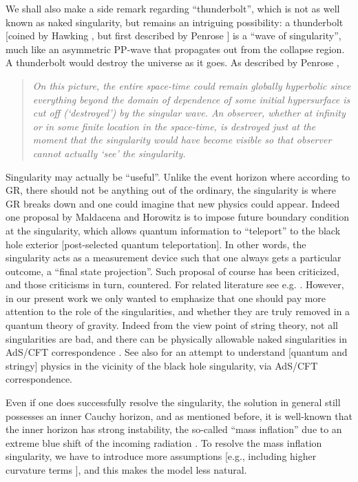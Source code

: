 \documentclass[12pt]{article}
\newcommand{\2}{$^2$}
\newcommand{\3}{$^3$}
\newcommand{\4}{$_4$}
\newcommand{\5}{$_5$}
\begin{document}
We shall also make a side remark regarding ``thunderbolt'', which is not as well known as naked singularity, but remains an intriguing possibility: a thunderbolt [coined by Hawking \cite{Hawking1993}, but first described by Penrose \cite{Penrose1978}] is a ``wave of singularity'', much like an asymmetric PP-wave that propagates out from the collapse region. A thunderbolt would destroy the universe as it goes. As described by Penrose \cite{Penrose1999}, 
\begin{quote}
\emph{On this picture, the entire space-time could remain globally hyperbolic since everything beyond the domain of dependence of some initial hypersurface is cut off (‘destroyed’) by the singular wave. An observer, whether at infinity or in some finite location in the space-time, is destroyed just at the moment that the singularity would have become visible so that observer cannot actually ‘see’ the singularity.}
\end{quote}

Singularity may actually be ``useful''. Unlike the event horizon where according to GR, there should not be anything out of the ordinary, the singularity is where GR breaks down and one could imagine that new physics could appear. Indeed one proposal by Maldacena and Horowitz is to impose future boundary condition at the singularity, which allows quantum information to ``teleport'' to the black hole exterior \cite{MalHor} [post-selected quantum teleportation]. In other words, the singularity acts as a measurement device such that one always gets a particular outcome, a ``final state projection''. Such proposal of course has been criticized, and those criticisms in turn, countered. For related literature see e.g. \cite{MH1,MH2,MH3,MH4,MH5}. However, in our present work we only wanted to emphasize that one should pay more attention to the role of the singularities, and whether they are truly removed in a quantum theory of gravity. Indeed from the view point of string theory, not all singularities are bad, and there can be physically allowable naked singularities
in AdS/CFT correspondence \cite{singularity}. See also \cite{0306170} for an attempt to understand [quantum and stringy] physics in the vicinity of the black hole singularity, via AdS/CFT correspondence.

Even if one does successfully resolve the singularity, the solution in general still possesses an inner Cauchy horizon, and as mentioned before, it is well-known that the inner horizon has strong instability, the so-called ``mass inflation'' due to an extreme blue shift of the incoming radiation \cite{Poisson:1990eh}. To resolve the mass inflation singularity, we have to introduce more assumptions [e.g., including higher curvature terms \cite{Hwang:2011kg}], and this makes the model less natural. 
\end{document}
